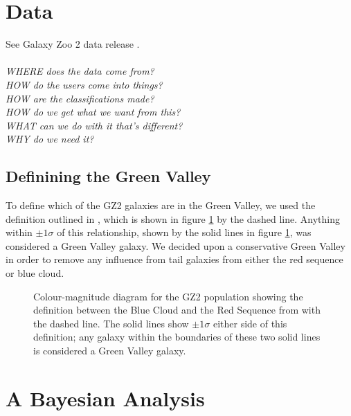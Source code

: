 \documentclass{mn2e}
\begin{document}
\section{Data}\label{data}
See Galaxy Zoo 2 data release \cite{GZ2}.
\\
\\
\emph{WHERE does the data come from? \\ HOW do the users come into things? \\ HOW are the classifications made? \\ HOW do we get what we want from this? \\ WHAT can we do with it that's different? \\ WHY do we need it?}

\subsection{Definining the Green Valley}
To define which of the GZ2 galaxies are in the Green Valley, we used the definition outlined in \citet{Baldry}, which is shown in figure \ref{CMGV} by the dashed line. Anything within $\pm 1\sigma$ of this relationship, shown by the solid lines in figure \ref{CMGV}, was considered a Green Valley galaxy. We decided upon a conservative Green Valley in order to remove any influence from tail galaxies from either the red sequence or blue cloud.

\begin{figure}
\caption{Colour-magnitude diagram for the GZ2 population showing the definition between the Blue Cloud and the Red Sequence from \citet{Baldry} with the dashed line. The solid lines show $\pm 1\sigma$ either side of this definition; any galaxy within the boundaries of these two solid lines is considered a Green Valley galaxy.}
\label{CMGV}
\end{figure}

\section{A Bayesian Analysis}\label{models}
\end{document}
